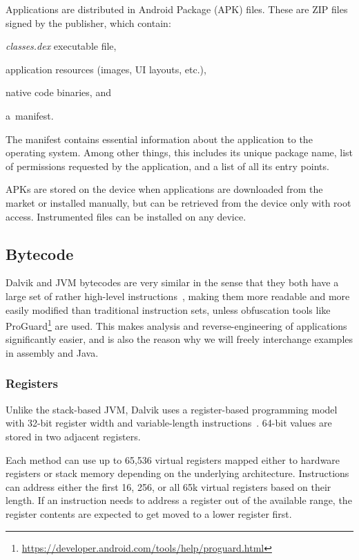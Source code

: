 \documentclass[12pt,twoside,notitlepage]{report}
\newcommand{\weblink}[1] {\footnote{\scriptsize\url{#1}}}
\begin{document}
Applications are distributed in Android Package (APK) files. These are ZIP files signed by the publisher, which contain:
\begin{inparaenum}[(i)]
\item \emph{classes.dex} executable file,
\item application resources (images, UI layouts, etc.),
\item native code binaries, and
\item a~manifest.
\end{inparaenum}

The manifest contains essential information about the application to the operating system. Among other things, this includes its unique package name, list of permissions requested by the application, and a list of all its entry points.

APKs are stored on the device when applications are downloaded from the market or installed manually, but can be retrieved from the device only with root access. Instrumented files can be installed on any device. 

\subsection{Bytecode}

Dalvik and JVM bytecodes are very similar in the sense that they both have a large set of rather high-level instructions~\cite{web:DalvikBytecode, web:JavaBytecode}, making them more readable and more easily modified than traditional instruction sets, unless obfuscation tools like ProGuard\weblink{https://developer.android.com/tools/help/proguard.html} are used. This makes analysis and reverse-engineering of applications significantly easier, and is also the reason why we will freely interchange examples in assembly and Java.

\subsubsection{Registers}

Unlike the stack-based JVM, Dalvik uses a register-based programming model with 32-bit register width and variable-length instructions~\cite{web:DalvikInsnFormat}. 64-bit values are stored in two adjacent registers.

Each method can use up to 65,536 virtual registers mapped either to hardware registers or stack memory depending on the underlying architecture. 
Instructions can address either the first 16, 256, or all 65k virtual registers based on their length. If an instruction needs to address a register out of the available range, the register contents are expected to get moved to a lower register first.
\end{document}
